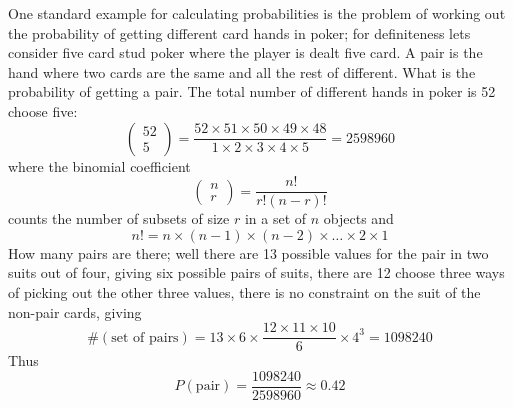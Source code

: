 \documentclass[11pt,a4paper]{scrartcl}
\begin{document}
One standard example for calculating probabilities is the problem of
working out the probability of getting different card hands in poker;
for definiteness lets consider five card stud poker where the player
is dealt five card. A pair is the hand where two cards are the
same and all the rest of different. What is the probability of getting a pair. The total number
of different hands in poker is 52 choose five:
\begin{equation}
\left(\begin{array}{c}52\\5\end{array}\right)=\frac{52\times 51\times 50\times 49\times 48}{1\times 2 \times 3 \times 4\times 5}=2598960
\end{equation}
where the binomial coefficient
\begin{equation}
\left(\begin{array}{c}n\\r\end{array}\right)=\frac{n!}{r!(n-r)!}
\end{equation}
counts the number of subsets of size $r$ in a set of $n$ objects and 
\begin{equation}
n!=n\times (n-1)\times (n-2)\times \ldots \times 2 \times 1
\end{equation}
How many pairs are there; well there are 13 possible values for the
pair in two suits out of four, giving six possible pairs of suits,
there are 12 choose three ways of picking out the other three values,
there is no constraint on the suit of the non-pair cards, giving
\begin{equation}
\#(\mbox{set of pairs})=13\times 6\times \frac{12\times 11\times 10}{6}\times 4^3=1098240
\end{equation}
Thus
\begin{equation}
P(\mbox{pair})=\frac{1098240}{2598960}\approx 0.42
\end{equation}
\end{document}
